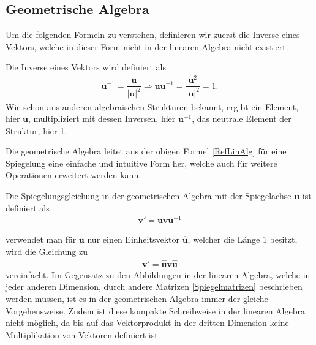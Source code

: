 \subsection{Geometrische Algebra}
Um die folgenden Formeln zu verstehen, definieren wir zuerst die Inverse eines Vektors, welche in dieser Form nicht in der linearen Algebra nicht existiert.
\begin{definition}
	Die Inverse eines Vektors wird definiert als
	\begin{align}
		\mathbf{u}^{-1} = \dfrac{\mathbf{u}}{|\mathbf{u}|^2} \Rightarrow \mathbf{uu}^{-1} = \dfrac{\mathbf{u}^2}{|\mathbf{u}|^2} = 1.
	\end{align}
	Wie schon aus anderen algebraischen Strukturen bekannt, ergibt ein Element, hier $\mathbf{u}$, multipliziert mit dessen Inversen, hier $\mathbf{u}^{-1}$, das neutrale Element der Struktur, hier 1.
\end{definition}
Die geometrische Algebra leitet aus der obigen Formel \eqref{RefLinAlg} für eine Spiegelung eine einfache und intuitive Form her, welche auch für weitere Operationen erweitert werden kann.
\begin{definition}
	Die Spiegelungsgleichung in der geometrischen Algebra mit der Spiegelachse $\mathbf{u}$ ist definiert als
	\begin{align}\label{RefGA}
		\mathbf{v}' = \mathbf{uvu}^{-1}
	\end{align}
\end{definition}

verwendet man für $\mathbf{u}$ nur einen Einheitsvektor $\mathbf{\hat{u}}$, welcher die Länge 1 besitzt, wird die Gleichung zu
\begin{align}
	\mathbf{v'} = \mathbf{\hat{u}v\hat{u}}
\end{align}
vereinfacht. Im Gegensatz zu den Abbildungen in der linearen Algebra, welche in jeder anderen Dimension, durch andere Matrizen \eqref{Spiegelmatrizen} beschrieben werden müssen, ist es in der geometrischen Algebra immer der gleiche Vorgehensweise. Zudem ist diese kompakte Schreibweise in der linearen Algebra nicht möglich, da bis auf das Vektorprodukt in der dritten Dimension keine Multiplikation von Vektoren definiert ist. 